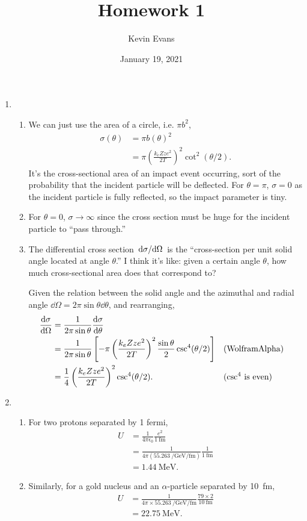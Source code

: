 \documentclass{homework}
\title{Homework 1}
\author{Kevin Evans}
\date{January 19, 2021}
\newcommand{\fm}{\femto\meter}
\begin{document}
	\maketitle
	\begin{enumerate}
		\item \begin{enumerate}
			\item We can just use the area of a circle, i.e. $\pi b^2$, \begin{align*}
				\sigma(\theta) & = \pi b(\theta)^2 \\
					& = \pi \left(\frac{k_e Zze^2}{2 T}\right)^2 \cot^2(\theta / 2).
			\end{align*}
			It's the cross-sectional area of an impact event occurring, sort of the probability that the incident particle will be deflected. For $\theta=\pi$, $\sigma = 0$ as the incident particle is fully reflected, so the impact parameter is tiny.
		
			\item For $\theta=0$, $\sigma\to\infty$ since the cross section must be huge for the incident particle to ``pass through.''
			
			\item The differential cross section $\dv*{\sigma}{\Omega}$ is the ``cross-section per unit solid angle located at angle $\theta$.'' I think it's like: given a certain angle $\theta$, how much cross-sectional area does that correspond to?
			
			Given the relation between the solid angle and the azimuthal and radial angle $\dd{\Omega} = 2 \pi \sin \theta \dd{\theta}$, and rearranging, \begin{align*}
					\dv{\sigma}{\Omega} & = \frac{1}{2 \pi \sin \theta} \dv{\sigma}{\theta} \\
						& = \frac{1}{2 \pi \sin \theta} \left[
							-\pi \left(\frac{k_e Zze^2}{2 T}\right)^2
							\frac{\sin\theta}{2}
							\csc[4](\theta / 2)
						\right] && \text{(WolframAlpha)} \\
						& = \frac{1}{4} \left(\frac{k_e Zze^2}{2 T}\right)^2 \csc^4(\theta / 2). && \text{($\csc^4$ is even)}
				\end{align*}
		\end{enumerate}
	
		\item %
			\begin{enumerate}
				\item For two protons separated by 1 fermi, \begin{align*}
					U & = \frac{1}{4 \pi \epsilon_0} \frac{e^2}{\SI{1}{\fm}} \\
						& = \frac{1}{4 \pi (\SI{55.263}{\per\GeV\per\fm})} \frac{1}{\SI{1}{\fm}} \\
						& = \SI{1.44}{\MeV}.
				\end{align*}
				\item Similarly, for a gold nucleus and an $\alpha$-particle separated by \SI{10}{\fm}, \begin{align*}
					U & = \frac{1}{4 \pi \times \SI{55.263}{\per\GeV \per \fm}} \frac{79 \times 2}{\SI{10}{\fm}} \\
						& = \SI{22.75}{\MeV}.
				\end{align*}
			

\end{enumerate}
\end{enumerate}
\end{document}
